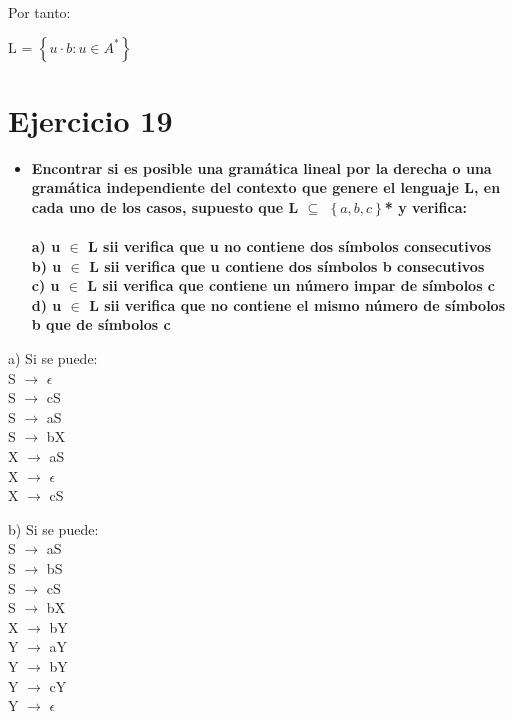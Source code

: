 Por tanto: 
\begin{center}
	
	L = $\left\lbrace u \cdot b: u \in A^* \right\rbrace$
\end{center}




\newpage
\section{Ejercicio 19}
\begin{itemize}
	\item \textbf{Encontrar si es posible una gramática lineal por la derecha o una gramática independiente del contexto que genere el lenguaje L, en cada uno de los casos, supuesto que L $\subseteq$ $\left\lbrace{a,b,c}\right\rbrace$* y verifica: \\ \\
	a) u $\in$ L sii verifica que u no contiene dos símbolos consecutivos \\
	b) u $\in$ L sii verifica que u contiene dos símbolos b consecutivos \\
	c) u $\in$ L sii verifica que contiene un número impar de símbolos c \\
	d) u $\in$ L sii verifica que no contiene el mismo número de símbolos b que de símbolos c}
\end{itemize}

\begin{center}
	a) Si se puede: \\
	S $\rightarrow$ $\epsilon$ \\
	S $\rightarrow$ cS \\
	S $\rightarrow$ aS\\
	S $\rightarrow$ bX\\
	X $\rightarrow$ aS\\
	X $\rightarrow$ $\epsilon$ \\
	X $\rightarrow$ cS \\
\end{center} 

\begin{center}
	b) Si se puede: \\
	S $\rightarrow$ aS \\
	S $\rightarrow$ bS \\
	S $\rightarrow$ cS \\
	S $\rightarrow$ bX \\
	X $\rightarrow$ bY \\
	Y $\rightarrow$ aY \\
	Y $\rightarrow$ bY \\
	Y $\rightarrow$ cY \\
	Y $\rightarrow$ $\epsilon$ \\
\end{center}


